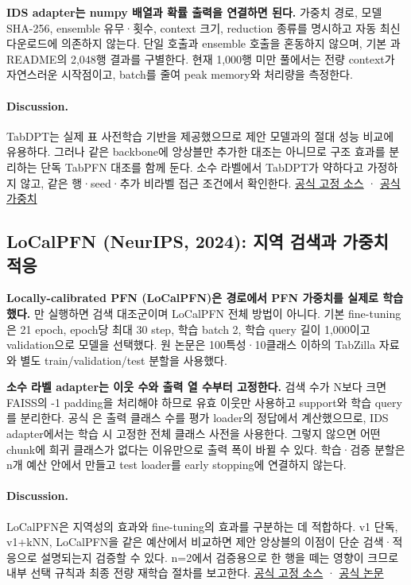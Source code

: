 \textbf{IDS adapter는 numpy 배열과 확률 출력을 연결하면 된다.} 가중치 경로, 모델 SHA-256, ensemble 유무·횟수, context 크기, reduction 종류를 명시하고 자동 최신 다운로드에 의존하지 않는다. 단일  호출과 ensemble 호출을 혼동하지 않으며, 기본 과 README의 2,048행 결과를 구별한다. 현재 1,000행 미만 풀에서는 전량 context가 자연스러운 시작점이고, batch를 줄여 peak memory와 처리량을 측정한다.

\paragraph{Discussion.}
TabDPT는 실제 표 사전학습 기반을 제공했으므로 제안 모델과의 절대 성능 비교에 유용하다. 그러나 같은 backbone에 앙상블만 추가한 대조는 아니므로 구조 효과를 분리하는 단독 TabPFN 대조를 함께 둔다. 소수 라벨에서 TabDPT가 약하다고 가정하지 않고, 같은 행·seed·추가 비라벨 접근 조건에서 확인한다.
\href{https://github.com/layer6ai-labs/TabDPT-inference/tree/93670551adba28b186354fab9a1584c56c34aa76}{공식 고정 소스} · \href{https://huggingface.co/Layer6/TabDPT}{공식 가중치}

\subsection{LoCalPFN (NeurIPS, 2024): 지역 검색과 가중치 적응}
\textbf{Locally-calibrated PFN (LoCalPFN)은  경로에서 PFN 가중치를 실제로 학습했다.} 만 실행하면 검색 대조군이며 LoCalPFN 전체 방법이 아니다. 기본 fine-tuning은 21 epoch, epoch당 최대 30 step, 학습 batch 2, 학습 query 길이 1,000이고 validation으로 모델을 선택했다. 원 논문은 100특성·10클래스 이하의 TabZilla 자료와 별도 train/validation/test 분할을 사용했다.

\textbf{소수 라벨 adapter는 이웃 수와 출력 열 수부터 고정한다.} 검색 수가 N보다 크면 FAISS의 -1 padding을 처리해야 하므로 유효 이웃만 사용하고 support와 학습 query를 분리한다. 공식 은 출력 클래스 수를 평가 loader의 정답에서 계산했으므로, IDS adapter에서는 학습 시 고정한 전체 클래스 사전을 사용한다. 그렇지 않으면 어떤 chunk에 희귀 클래스가 없다는 이유만으로 출력 폭이 바뀔 수 있다. 학습·검증 분할은 n개 예산 안에서 만들고 test loader를 early stopping에 연결하지 않는다.

\paragraph{Discussion.}
LoCalPFN은 지역성의 효과와 fine-tuning의 효과를 구분하는 데 적합하다. v1 단독, v1+kNN, LoCalPFN을 같은 예산에서 비교하면 제안 앙상블의 이점이 단순 검색·적응으로 설명되는지 검증할 수 있다. n=2에서 검증용으로 한 행을 떼는 영향이 크므로 내부 선택 규칙과 최종 전량 재학습 절차를 보고한다.
\href{https://github.com/layer6ai-labs/LoCalPFN/tree/ff8803c57cd277380b2444f0f5ed4856b46f47f5}{공식 고정 소스} · \href{https://papers.nips.cc/paper_files/paper/2024/hash/c40daf14d7a6469e65116507c21faeb7-Abstract-Conference.html}{공식 논문}

